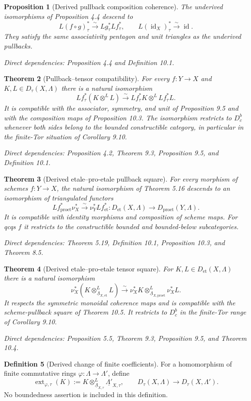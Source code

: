 \documentclass[10pt]{article}
\newtheorem{theorem}{Theorem}[section]
\newtheorem{proposition}[theorem]{Proposition}
\theoremstyle{definition}
\newtheorem{definition}[theorem]{Definition}
\newcommand{\Lam}{\Lambda}
\newcommand{\et}{\mathrm{et}}
\newcommand{\proet}{\mathrm{proet}}
\newcommand{\Dbc}{D^b_c}
\newcommand{\id}{\operatorname{id}}
\newcommand{\dep}[1]{\par\smallskip\noindent\textit{Direct dependencies: #1}}
\begin{document}
\begin{proposition}[Derived pullback composition coherence]
The underived isomorphisms of Proposition 4.4 descend to
\[
L(f\circ g)_\tau^*\xrightarrow{\sim}Lg_\tau^*Lf_\tau^*,
\qquad L(\id_X)_\tau^*\xrightarrow{\sim}\id.
\]
They satisfy the same associativity pentagon and unit triangles as the
underived pullbacks.
\dep{Proposition 4.4 and Definition 10.1.}
\end{proposition}

\begin{theorem}[Pullback--tensor compatibility]
For every $f:Y\to X$ and $K,L\in D_\tau(X,\Lam)$ there is a natural
isomorphism
\[
Lf_\tau^*(K\otimes^L L)
\xrightarrow{\sim}
Lf_\tau^*K\otimes^L Lf_\tau^*L.
\]
It is compatible with the associator, symmetry, and unit of Proposition 9.5
and with the composition maps of Proposition 10.3.  The isomorphism restricts
to $\Dbc$ whenever both sides belong to the bounded constructible category,
in particular in the finite-Tor situation of Corollary 9.10.
\dep{Proposition 4.2, Theorem 9.3, Proposition 9.5, and Definition 10.1.}
\end{theorem}

\begin{theorem}[Derived etale--pro-etale pullback square]
For every morphism of schemes $f:Y\to X$, the natural isomorphism of Theorem
5.16 descends to an isomorphism of triangulated functors
\[
Lf_\proet^*\nu_X^*
\xrightarrow{\sim}
\nu_Y^*Lf_\et^*:
D_\et(X,\Lam)\longrightarrow D_\proet(Y,\Lam).
\]
It is compatible with identity morphisms and composition of scheme maps.  For
qcqs $f$ it restricts to the constructible bounded and bounded-below
subcategories.
\dep{Theorem 5.19, Definition 10.1, Proposition 10.3, and Theorem 8.5.}
\end{theorem}

\begin{theorem}[Derived etale--pro-etale tensor square]
For $K,L\in D_\et(X,\Lam)$ there is a natural isomorphism
\[
\nu_X^*(K\otimes^L_{\underline\Lam_{X,\et}}L)
\xrightarrow{\sim}
\nu_X^*K\otimes^L_{\underline\Lam_{X,\proet}}\nu_X^*L.
\]
It respects the symmetric monoidal coherence maps and is compatible with the
scheme-pullback square of Theorem 10.5.  It restricts to $\Dbc$ in the
finite-Tor range of Corollary 9.10.
\dep{Proposition 5.5, Theorem 9.3, Proposition 9.5, and Theorem 10.4.}
\end{theorem}

\begin{definition}[Derived change of finite coefficients]
For a homomorphism of finite commutative rings $\varphi:\Lam\to\Lam'$, define
\[
\operatorname{ext}_{\varphi,\tau}(K)
:=K\otimes^L_{\underline\Lam_{X,\tau}}
\underline{\Lam'}_{X,\tau},
\qquad
D_\tau(X,\Lam)\to D_\tau(X,\Lam').
\]
No boundedness assertion is included in this definition.
\end{definition}
\end{document}
